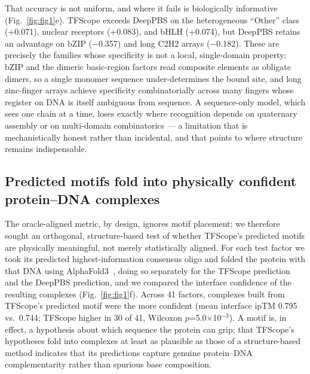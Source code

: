 \documentclass[11pt,letterpaper]{article}
\begin{document}
That accuracy is not uniform, and where it fails is biologically informative
(Fig.~\ref{fig:fig1}e). TFScope exceeds DeepPBS on the heterogeneous ``Other'' class (+0.071),
nuclear receptors (+0.083), and bHLH (+0.074), but DeepPBS retains an advantage on bZIP
($-$0.357) and long C2H2 arrays ($-$0.182). These are precisely the families whose specificity is
not a local, single-domain property: bZIP and the dimeric basic-region factors read composite
elements as obligate dimers, so a single monomer sequence under-determines the bound site, and
long zinc-finger arrays achieve specificity combinatorially across many fingers whose register on
DNA is itself ambiguous from sequence. A sequence-only model, which sees one chain at a time,
loses exactly where recognition depends on quaternary assembly or on multi-domain combinatorics
--- a limitation that is mechanistically honest rather than incidental, and that points to where
structure remains indispensable.

\subsection*{Predicted motifs fold into physically confident protein--DNA complexes}
The oracle-aligned metric, by design, ignores motif placement; we therefore sought an orthogonal,
structure-based test of whether TFScope's predicted motifs are physically meaningful, not merely
statistically aligned. For each test factor we took its predicted highest-information consensus
oligo and folded the protein with that DNA using AlphaFold3~\cite{Jumper2021}, doing so separately
for the TFScope prediction and the DeepPBS prediction, and we compared the interface confidence of
the resulting complexes (Fig.~\ref{fig:fig1}f). Across 41 factors, complexes built from TFScope's
predicted motif were the more confident (mean interface ipTM 0.795 vs.\ 0.744; TFScope higher in
30 of 41, Wilcoxon $p$=5.0$\times$10$^{-3}$). A motif is, in effect, a hypothesis about which
sequence the protein can grip; that TFScope's hypotheses fold into complexes at least as
plausible as those of a structure-based method indicates that its predictions capture genuine
protein--DNA complementarity rather than spurious base composition.
\end{document}
